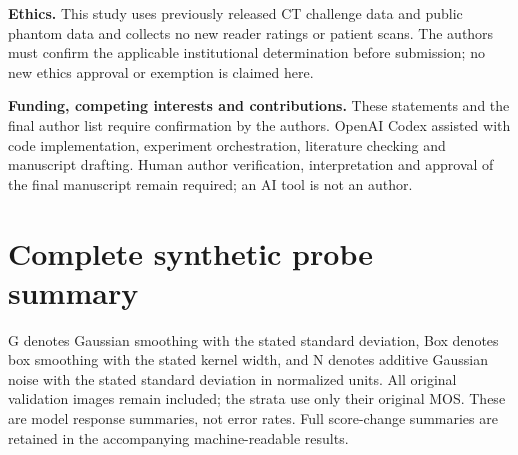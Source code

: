 \documentclass[11pt]{article}
\begin{document}
\textbf{Ethics.} This study uses previously released CT challenge data and public phantom data and collects no new reader ratings or patient scans. The authors must confirm the applicable institutional determination before submission; no new ethics approval or exemption is claimed here.

\textbf{Funding, competing interests and contributions.} These statements and the final author list require confirmation by the authors. OpenAI Codex assisted with code implementation, experiment orchestration, literature checking and manuscript drafting. Human author verification, interpretation and approval of the final manuscript remain required; an AI tool is not an author.

\clearpage
\appendix
\section{Complete synthetic probe summary}
G denotes Gaussian smoothing with the stated standard deviation, Box denotes box smoothing with the stated kernel width, and N denotes additive Gaussian noise with the stated standard deviation in normalized units. All original validation images remain included; the strata use only their original MOS. These are model response summaries, not error rates. Full score-change summaries are retained in the accompanying machine-readable results.

\clearpage
\end{document}
